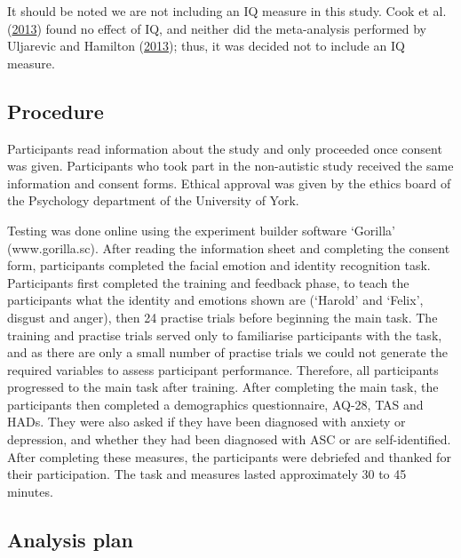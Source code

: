 \documentclass[
]{article}
\begin{document}
It should be noted we are not including an IQ measure in this study. Cook et al. (\protect\hyperlink{ref-cook2013a}{2013}) found no effect of IQ, and neither did the meta-analysis performed by Uljarevic and Hamilton (\protect\hyperlink{ref-uljarevic2013a}{2013}); thus, it was decided not to include an IQ measure.

\hypertarget{procedure}{%
\subsection*{Procedure}\label{procedure}}

Participants read information about the study and only proceeded once consent was given. Participants who took part in the non-autistic study received the same information and consent forms. Ethical approval was given by the ethics board of the Psychology department of the University of York.

Testing was done online using the experiment builder software `Gorilla' (www.gorilla.sc). After reading the information sheet and completing the consent form, participants completed the facial emotion and identity recognition task. Participants first completed the training and feedback phase, to teach the participants what the identity and emotions shown are (`Harold' and `Felix', disgust and anger), then 24 practise trials before beginning the main task. The training and practise trials served only to familiarise participants with the task, and as there are only a small number of practise trials we could not generate the required variables to assess participant performance. Therefore, all participants progressed to the main task after training. After completing the main task, the participants then completed a demographics questionnaire, AQ-28, TAS and HADs. They were also asked if they have been diagnosed with anxiety or depression, and whether they had been diagnosed with ASC or are self-identified. After completing these measures, the participants were debriefed and thanked for their participation. The task and measures lasted approximately 30 to 45 minutes.

\hypertarget{analysis-plan}{%
\subsection*{Analysis plan}\label{analysis-plan}}
\end{document}
